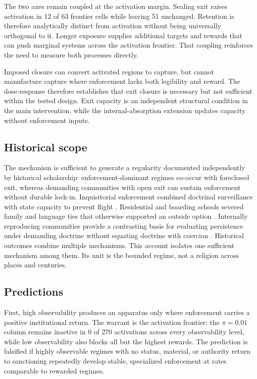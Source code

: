 \documentclass[12pt]{article}
\begin{document}
The two axes remain coupled at the activation margin. Sealing exit raises activation in 12 of 63 frontier cells while
leaving 51 unchanged. Retention is therefore analytically distinct from activation without being universally orthogonal
to it. Longer exposure supplies additional targets and rewards that can push marginal systems across the activation
frontier. That coupling reinforces the need to measure both processes directly.

Imposed closure can convert activated regions to capture, but cannot manufacture capture where enforcement lacks both
legibility and reward. The dose-response therefore establishes that exit closure is necessary but not sufficient within
the tested design. Exit capacity is an independent structural condition in the main intervention, while the
internal-absorption extension updates capacity without enforcement inputs.

\subsection{Historical scope}

The mechanism is sufficient to generate a regularity documented independently by historical scholarship:
enforcement-dominant regimes co-occur with foreclosed exit, whereas demanding communities with open exit can sustain
enforcement without durable lock-in. Inquisitorial enforcement combined doctrinal surveillance with state capacity to
prevent flight \citep{given1997}. Residential and
boarding schools severed family and language ties that otherwise supported an outside option \citep{adams1995}. Internally
reproducing communities provide a contrasting basis for evaluating persistence under demanding doctrine without equating
doctrine with coercion \citep{hostetler1974}.
Historical outcomes combine multiple mechanisms. This account isolates one sufficient mechanism among them. Its unit is
the bounded regime, not a religion across places and centuries.

\subsection{Predictions}

First, high observability produces an apparatus only where enforcement carries a positive institutional return. The
warrant is the activation frontier: the \(\pi=0.01\) column remains inactive in 0 of 270 activations across every
observability level, while low observability also blocks all but the highest rewards. The prediction is falsified if
highly observable regimes with no status, material, or authority return to sanctioning repeatedly develop stable,
specialized enforcement at rates comparable to rewarded regimes.
\end{document}
